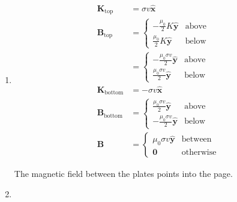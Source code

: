 \documentclass{article}
\renewcommand{\vec}[1]{\boldsymbol{\mathbf{#1}}}
\newcommand{\uvec}[1]{\hat{\vec{#1}}}
\begin{document}
\subsection{}

\begin{enumerate}
  \item

        \begin{align*}
          \vec{K}_\text{top}    & = \sigma v \uvec{x}                                 \\
          \vec{B}_\text{top}    & = \begin{cases}
                                      -\frac{\mu_0}{2} K \uvec{y} & \text{above} \\
                                      \frac{\mu_0}{2} K \uvec{y}  & \text{below}
                                    \end{cases}        \\
                                & = \begin{cases}
                                      -\frac{\mu_0 \sigma v}{2} \uvec{y} & \text{above} \\
                                      \frac{\mu_0 \sigma v}{2} \uvec{y}  & \text{below}
                                    \end{cases} \\
          \vec{K}_\text{bottom} & = -\sigma v \uvec{x}                                \\
          \vec{B}_\text{bottom} & = \begin{cases}
                                      \frac{\mu_0 \sigma v}{2} \uvec{y}  & \text{above} \\
                                      -\frac{\mu_0 \sigma v}{2} \uvec{y} & \text{below}
                                    \end{cases} \\
          \vec{B}               & = \begin{cases}
                                      \mu_0 \sigma v \uvec{y} & \text{between}   \\
                                      \vec{0}                 & \text{otherwise}
                                    \end{cases}
        \end{align*}

        The magnetic field between the plates points into the page.

  \item


\end{enumerate}
\end{document}

